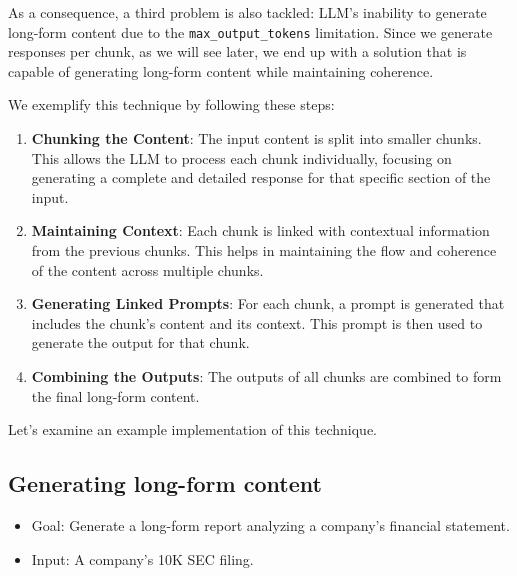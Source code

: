 As a consequence, a third problem is also tackled: LLM's inability to generate long-form content due to the \texttt{max\_output\_tokens} limitation. Since we generate responses per chunk, as we will see later, we end up with a solution that is capable of generating long-form content while maintaining coherence.

We exemplify this technique by following these steps:
\begin{enumerate}
\item \textbf{Chunking the Content}: The input content is split into smaller chunks. This allows the LLM to process each chunk individually, focusing on generating a complete and detailed response for that specific section of the input.

\item \textbf{Maintaining Context}: Each chunk is linked with contextual information from the previous chunks. This helps in maintaining the flow and coherence of the content across multiple chunks.

\item \textbf{Generating Linked Prompts}: For each chunk, a prompt is generated that includes the chunk's content and its context. This prompt is then used to generate the output for that chunk.

\item \textbf{Combining the Outputs}: The outputs of all chunks are combined to form the final long-form content.
\end{enumerate}

Let's examine an example implementation of this technique.

\subsection{Generating long-form content}

\begin{itemize}
\item Goal: Generate a long-form report analyzing a company's financial statement.
\item Input: A company's 10K SEC filing.
\end{itemize}

